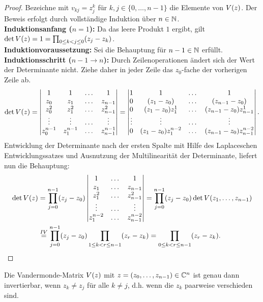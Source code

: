 \begin{proof}
    Bezeichne mit $v_{kj} = z_j^k$ für $k,j \in \{0, \dots, n-1\}$ die Elemente von $\text{$V(z)$}$.
    Der Beweis erfolgt durch vollständige Induktion über $n \in \mathbb{N}$.\\
    \textbf{Induktionsanfang ($n=1$):}
    Da das leere Produkt $1$ ergibt, gilt
    $\det{\text{$V(z)$}} = 1 = \prod_{0 \leq k < j \leq 0} (z_j - z_k)$. \\[0.5em]
    \textbf{Induktionvoraussetzung:}
    Sei die Behauptung für $n-1 \in \mathbb{N}$ erfüllt.\\[0.5em]
    \textbf{Induktionsschritt ($n-1 \rightarrow n$):}
    Durch Zeilenoperationen ändert sich der Wert der Determinante nicht.
    Ziehe daher in jeder Zeile das $z_0$-fache der vorherigen Zeile ab.
    \[
        \det{\text{$V(z)$}}
        = \begin{vmatrix}
            1         & 1         & \dots & 1 \\
            z_0       & z_1       & \dots & z_{n-1} \\
            z_0^2     & z_1^2     & \dots & z_{n-1}^2 \\
            \vdots    & \vdots    & \dots & \vdots \\
            z_0^{n-1} & z_1^{n-1} & \dots & z_{n-1}^{n-1}
        \end{vmatrix}
        = \begin{vmatrix}
            1      & 1                  & \dots & 1 \\
            0      & (z_1-z_0)          & \dots & (z_{n-1}-z_0) \\
            0      & (z_1-z_0)z_1^1     & \dots & (z_{n-1}-z_0) z_{n-1}^1 \\
            \vdots & \vdots             & \dots & \vdots \\
            0      & (z_1-z_0)z_1^{n-2} & \dots & (z_{n-1}-z_0) z_{n-1}^{n-2}
        \end{vmatrix}.
    \]
    Entwicklung der Determinante nach der ersten Spalte mit Hilfe des
    Laplaceschen Entwicklungssatzes und Ausnutzung der Multilinearität der
    Determinante, liefert nun die Behauptung:
    \[
        \begin{split}
            \det{\text{$V(z)$}}
            &= \prod_{j=0}^{n-1} (z_j - z_0) \begin{vmatrix}
                1         & \dots & 1 \\
                z_1       & \dots & z_{n-1} \\
                z_1^2     & \dots & z_{n-1}^2 \\
                \vdots    & \dots & \vdots \\
                z_1^{n-2} & \dots & z_{n-1}^{n-2}
            \end{vmatrix}
            = \prod_{j=0}^{n-1} (z_j - z_0) \det{\text{$V(z_1, \dots, z_{n-1})$}}\\
            &\overset{IV}{=} \prod_{j=0}^{n-1} (z_j - z_0) \prod_{1 \leq k < r \leq n-1} (z_r - z_k)
            = \prod_{0 \leq k < r \leq n-1} (z_r - z_k).
        \end{split}
    \]
\end{proof}

\begin{corollary}
    Die Vandermonde-Matrix $\text{$V(z)$}$ mit
    $z = (z_0, \dots, z_{n-1}) \in \mathbb{C}^n$ ist genau dann invertierbar, wenn
    $z_k \neq z_j$ für alle $k \neq j$, d.h. wenn die $z_k$ paarweise
    verschieden sind.
\end{corollary}
